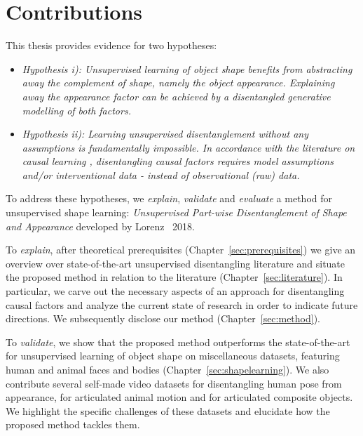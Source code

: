\section{Contributions}\label{sec:contributions}
	This thesis provides evidence for two hypotheses:
	\begin{itemize}
		\item  \textit{Hypothesis \emph{i)}: Unsupervised learning of object shape benefits from abstracting away the complement of shape, namely the object appearance. Explaining away the appearance factor can be achieved by a disentangled generative modelling of both factors.}
		\item \textit{Hypothesis \emph{ii)}: Learning unsupervised disentanglement without any assumptions is fundamentally impossible. In accordance with the literature on causal learning \cite{pearl18impediments}, disentangling causal factors requires model assumptions and/or interventional data - instead of observational (raw) data.}
	\end{itemize}
	To address these hypotheses, we \textit{explain}, \textit{validate} and \textit{evaluate} a method for unsupervised shape learning: \textit{Unsupervised Part-wise Disentanglement of Shape and Appearance} developed by Lorenz \etal\ 2018.


	To \textit{explain}, after theoretical prerequisites (Chapter~\ref{sec:prerequisites}) we give an overview over state-of-the-art unsupervised disentangling literature and situate the proposed method in relation to the literature (Chapter~\ref{sec:literature}). In particular, we carve out the necessary aspects of an approach for disentangling causal factors and analyze the current state of research in order to indicate future directions.
	We subsequently disclose our method (Chapter~\ref{sec:method}).


	To \textit{validate}, we show that the proposed method outperforms the state-of-the-art for unsupervised learning of object shape on miscellaneous datasets, featuring human and animal faces and bodies (Chapter~\ref{sec:shapelearning}).
	We also contribute several self-made video datasets for disentangling human pose from appearance, for articulated animal motion and for articulated composite objects. We highlight the specific challenges of these datasets and elucidate how the proposed method tackles them.


